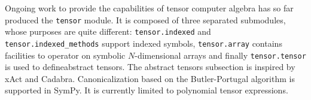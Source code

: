 Ongoing work to provide the capabilities of tensor computer algebra has so far
produced the \verb|tensor| module.  It is composed of three separated
submodules, whose purposes are quite different: \verb|tensor.indexed| and
\verb|tensor.indexed_methods| support indexed symbols,
\verb|tensor.array| contains facilities to operator on symbolic $N$-dimensional
arrays and finally \verb|tensor.tensor| is used to defineabstract tensors.
The abstract tensors subsection
is inspired by xAct\cite{xAct} and Cadabra\cite{Peeters2007cadabra}.
Canonicalization based on the Butler-Portugal\cite{ManssurPortugal1999}
algorithm is supported in SymPy.  It is currently limited to polynomial tensor
expressions.

